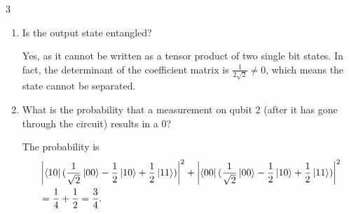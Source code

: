 \documentclass[11pt]{article}
\begin{document}
\begin{problem}{3}
\begin{enumerate}[label=(\alph*)]
\begin{answer}
\begin{equation}
          \end{equation}
          \end{answer}
    \item Is the output state entangled?
          \begin{answer}
            Yes, as it cannot be written as a tensor product of two single bit states.
            In fact, the determinant of the coefficient matrix is \( \frac{1}{2 \sqrt{2}} \neq 0 \), which means the state cannot be separated.
          \end{answer}
    \item What is the probability that a measurement on qubit 2 (after it has gone through the circuit) results in a 0?
          \begin{answer}
            The probability is
            \begin{equation}
            \label{eq:8}
            \begin{aligned}
              &\left| \bra{10}(\frac{1}{\sqrt{2}}\ket{00} - \frac{1}{2}\ket{10} + \frac{1}{2}\ket{11}) \right|^2 + \left| \bra{00}(\frac{1}{\sqrt{2}}\ket{00} - \frac{1}{2}\ket{10} + \frac{1}{2}\ket{11}) \right|^2 \\
              &= \frac{1}{4} + \frac{1}{2} = \frac{3}{4}.
            \end{aligned}
            \end{equation}
          \end{answer}
  \end{enumerate}
\end{problem}
\end{document}
